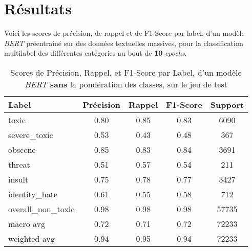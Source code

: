 \section{Résultats}

Voici les scores de précision, de rappel et de F1-Score par label, d'un modèle \textit{BERT} préentraîné sur des données textuelles massives, pour la classification multilabel des différentes catégories au bout de \textbf{10} \textit{epochs}.

\begin{table}[ht]
    \centering
    \caption{Scores de Précision, Rappel, et F1-Score par Label, d'un modèle \textit{BERT} \textbf{sans} la pondération des classes, sur le jeu de test}    \begin{tabular}{lcccc}
    \hline
    \textbf{Label} & \textbf{Précision} & \textbf{Rappel} & \textbf{F1-Score} & \textbf{Support} \\ \hline
    toxic          & 0.80               & 0.85            & 0.83              & 6090             \\
    severe\_toxic  & 0.53               & 0.43            & 0.48              & 367              \\
    obscene        & 0.85               & 0.83            & 0.84              & 3691             \\
    threat         & 0.51               & 0.57            & 0.54              & 211              \\
    insult         & 0.75               & 0.78            & 0.77              & 3427             \\
    identity\_hate & 0.61               & 0.55            & 0.58              & 712              \\
    overall\_non\_toxic & 0.98           & 0.98            & 0.98             & 57735            \\\hline
    macro avg      & 0.72              & 0.71            & 0.72              & 72233            \\
    weighted avg   & 0.94               & 0.95            & 0.94            & 72233            \\ \hline
    \end{tabular}
    \label{tab:scores}
\end{table}



